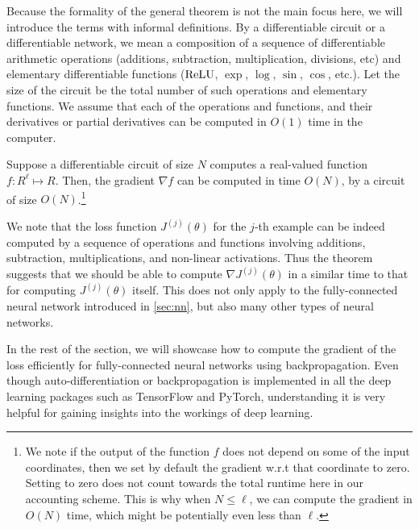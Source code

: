 Because the formality of the general theorem is not the main focus here,
we will introduce the terms with informal definitions. By a differentiable
circuit or a differentiable network, we mean a composition of a sequence of
differentiable arithmetic operations (additions, subtraction, multiplication,
divisions, etc) and elementary differentiable functions ($\operatorname{ReLU}$, $\exp$, $\log$, $\sin$,
$\cos$, etc.). Let the size of the circuit be the total number of such operations
and elementary functions. We assume that each of the operations and
functions, and their derivatives or partial derivatives can be computed in $O(1)$
time in the computer.

\begin{theorem}
Suppose a differentiable circuit of size $N$ computes a real-valued function
$f : R^\ell \mapsto R$. Then, the gradient $\nabla f$ can be computed in time $O(N)$, by a %
circuit of size $O(N)$.\footnote{
We note if the output of the function $f$ does not depend on some of the input coordinates,
then we set by default the gradient w.r.t that coordinate to zero. Setting to zero does
not count towards the total runtime here in our accounting scheme. This is why when
$N \le \ell$, we can compute the gradient in $O(N)$ time, which might be potentially even less
than $\ell$.}
\end{theorem}

We note that the loss function $J^{(j)}(\theta)$ for the $j$-th example can be indeed
computed by a sequence of operations and functions involving additions,
subtraction, multiplications, and non-linear activations. Thus the theorem
suggests that we should be able to compute $\nabla J^{(j)}(\theta)$ in a similar time to that
for computing $J^{(j)}(\theta)$ itself. This does not only apply to the fully-connected
neural network introduced in \cref{sec:nn}, but also many other types of neural
networks.

In the rest of the section, we will showcase how to compute the gradient of
the loss efficiently for fully-connected neural networks using backpropagation.
Even though auto-differentiation or backpropagation is implemented in all
the deep learning packages such as TensorFlow and PyTorch, understanding
it is very helpful for gaining insights into the workings of deep learning.

